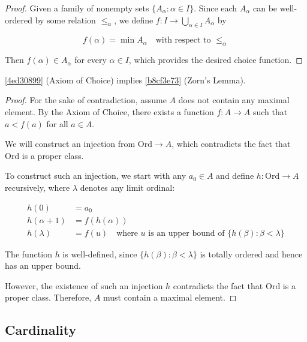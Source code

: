 \begin{proof}
    Given a family of nonempty sets $\{A_{\alpha}: \alpha \in I \}$. Since each $A_{\alpha}$ can be well-ordered by 
    some relation $\le_{\alpha}$, we define $f: I \to \bigcup_{\alpha \in I} A_{\alpha}$ by

    \[
        f(\alpha) = \min A_{\alpha} \quad \text{with respect to } \le_{\alpha}
    \]
    
    Then $f(\alpha) \in A_{\alpha}$ for every $\alpha \in I$, which provides the desired choice function.
\end{proof}

\begin{thm}
    \cref{4ed30899} (Axiom of Choice) implies \cref{b8cf3e73} (Zorn's Lemma).
\end{thm}

\begin{proof}
    For the sake of contradiction, assume $A$ does not contain any maximal element.
    By the Axiom of Choice, there exists a function $f: A \to A$ such that $a < f(a)$ for all $a \in A$.

    We will construct an injection from $\mathrm{Ord} \to A$, which contradicts the fact that $\mathrm{Ord}$ is a proper class.

    To construct such an injection, we start with any $a_0 \in A$ and define $h: \mathrm{Ord} \to A$ recursively, where $\lambda$ denotes any limit ordinal:

    \begin{align*}
        h(0) &= a_0 \\
        h(\alpha + 1) &= f(h(\alpha)) \\
        h(\lambda) &= f(u) \quad \text{where } u \text{ is an upper bound of } \{ h(\beta): \beta < \lambda \}
    \end{align*}

    The function $h$ is well-defined, since $\{ h(\beta): \beta < \lambda \}$ is totally ordered and hence has an upper bound.

    However, the existence of such an injection $h$ contradicts the fact that $\mathrm{Ord}$ is a proper class. Therefore, $A$ must contain a maximal element.
\end{proof}

\subsection{Cardinality}

